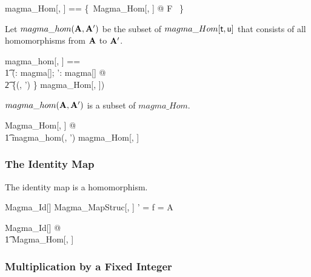 \documentclass{amsart}
\begin{document}
\begin{zed}
	magma\_Hom[\genT, \genU] == \{~Magma\_Hom[\genT, \genU] @ F ~\}
\end{zed}

Let $magma\_hom(\mathbf{A}, \mathbf{A}')$ be the subset of $magma\_Hom[\mathsf{t}, \mathsf{u}]$ 
that consists of all homomorphisms from $\mathbf{A}$ to $\mathbf{A}'$.

\begin{zed}
	magma\_hom[\genT, \genU] == \\
	\t1	(\lambda \strucA: magma[\genT]; \strucA': magma[\genU] @ \\
	\t2		\{(\strucA, \strucA') \} \dres magma\_Hom[\genT, \genU])
\end{zed}

\begin{remark} $magma\_hom(\mathbf{A}, \mathbf{A}')$ is a subset of $magma\_Hom$.

\begin{zed}
	\forall Magma\_Hom[\setT, \setU] @ \\
	\t1	magma\_hom(\strucA, \strucA') \subseteq magma\_Hom[\setT, \setU]
\end{zed}

\end{remark}

\subsubsection{The Identity Map}

\begin{example} The identity map is a homomorphism.

\begin{schema}{Magma\_Id}[\genT]
	Magma\_MapStruc[\genT, \genT]
\where
	\strucA' = \strucA
\also
	f = \id A
\end{schema}

\begin{zed}
	\forall Magma\_Id[\setT] @ \\
	\t1	Magma\_Hom[\setT, \setT]
\end{zed}

\end{example}

\subsubsection{Multiplication by a Fixed Integer}
\end{document}
